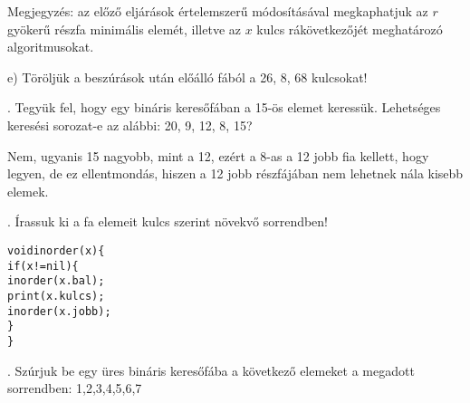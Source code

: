 \documentclass[12pt]{article}
\begin{document}
Megjegyzés: az előző eljárások értelemszerű módosításával megkaphatjuk az $r$ gyökerű részfa minimális elemét, illetve az $x$ kulcs rákövetkezőjét meghatározó algoritmusokat.

\noindent e) Töröljük a beszúrások után előálló fából a 26, 8, 68 kulcsokat!

\begin{figure}[!h]
\centering
\end{figure}

. Tegyük fel, hogy egy bináris keresőfában a 15-ös elemet keressük. Lehetséges keresési sorozat-e az alábbi: 20, 9, 12, 8, 15?

Nem, ugyanis 15 nagyobb, mint a 12, ezért a 8-as a 12 jobb fia kellett, hogy legyen, de ez ellentmondás, hiszen a 12 jobb részfájában nem lehetnek nála kisebb elemek.

. Írassuk ki a fa elemeit kulcs szerint növekvő sorrendben!

\begin{alltt}
      void inorder(x) \{
        if(x!=nil) \{
          inorder(x.bal);
          print(x.kulcs);
          inorder(x.jobb);
        \}
      \}
\end{alltt}

. Szúrjuk be egy üres bináris keresőfába a következő elemeket a megadott sorrendben: 1,2,3,4,5,6,7

\begin{figure}[!h]
\centering
\end{figure}
\end{document}
